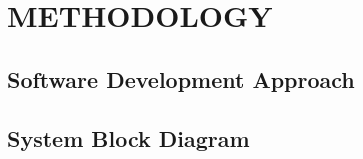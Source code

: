 \clearpage
\section{METHODOLOGY}


\subsection{Software Development Approach}



\subsection{System Block Diagram}


